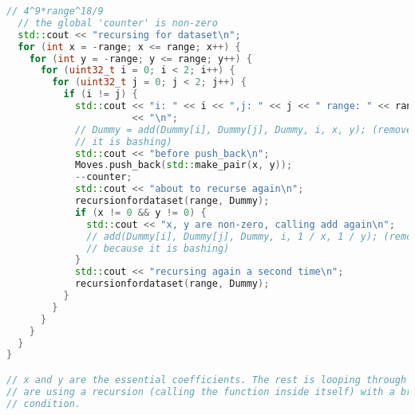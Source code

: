 \documentclass{article}
\begin{document}
\begin{lstlisting}[language=C++]
  // 4^9*range^18/9
  // the global 'counter' is non-zero
  std::cout << "recursing for dataset\n";
  for (int x = -range; x <= range; x++) {
    for (int y = -range; y <= range; y++) {
      for (uint32_t i = 0; i < 2; i++) {
        for (uint32_t j = 0; j < 2; j++) {
          if (i != j) {
            std::cout << "i: " << i << ",j: " << j << " range: " << range
                      << "\n";
            // Dummy = add(Dummy[i], Dummy[j], Dummy, i, x, y); (removed because
            // it is bashing)
            std::cout << "before push_back\n";
            Moves.push_back(std::make_pair(x, y));
            --counter;
            std::cout << "about to recurse again\n";
            recursionfordataset(range, Dummy);
            if (x != 0 && y != 0) {
              std::cout << "x, y are non-zero, calling add again\n";
              // add(Dummy[i], Dummy[j], Dummy, i, 1 / x, 1 / y); (removed
              // because it is bashing)
            }
            std::cout << "recursing again a second time\n";
            recursionfordataset(range, Dummy);
          }
        }
      }
    }
  }
}

// x and y are the essential coefficients. The rest is looping through Dummy. We
// are using a recursion (calling the function inside itself) with a break
// condition.


\end{lstlisting}
\end{document}
